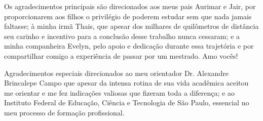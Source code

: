 \begin{agradecimentos}

Os agradecimentos principais são direcionados aos meus pais Aurimar e Jair,
por proporcionarem aos filhos o privilégio de poderem estudar sem que nada jamais
faltasse; à minha irmã Thais, que apesar dos milhares de quilômetros de distância
seu carinho e incentivo para a conclusão desse trabalho nunca cessaram; e a minha
companheira Evelyn, pelo apoio e dedicação durante essa trajetória e por compartilhar
comigo a experiência de passar por um mestrado. Amo vocês!

Agradecimentos especiais direcionados ao meu orientador Dr. Alexandre Brincalepe Campo
que apesar da intensa rotina de sua vida acadêmica aceitou me orientar e me fez indicações
valiosas que fizeram toda a diferença; e ao Instituto Federal de Educação, Ciência e
Tecnologia de São Paulo, essencial no meu processo de formação profissional.

\end{agradecimentos}
